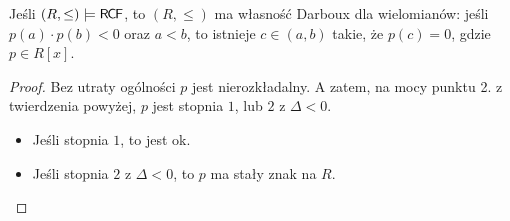 \documentclass{article}
\begin{document}
\begin{wn}
	Jeśli $ (R, \leq) \models \mathsf{R \mkern-1.7mu C \mkern-1.4mu F} $, to $ (R, \leq) $ ma własność Darboux dla wielomianów:
	jeśli $ p(a) \cdot p(b) < 0 $ oraz $ a <b $, to istnieje $c \in (a, b) $ takie, że $ p(c) = 0 $, gdzie $ p \in R[x] $.
\end{wn}
\begin{proof}
	 Bez utraty ogólności $ p $ jest nierozkładalny.
	 A zatem, na mocy punktu 2. z twierdzenia powyżej, $ p $ jest stopnia $ 1 $, lub $ 2 $ z $ \Delta < 0$.
	 \begin{itemize}
		 \item Jeśli stopnia $ 1 $, to jest ok.
		 \item Jeśli stopnia $2$ z $\Delta < 0 $, to $ p $ ma stały znak na $ R $.
	 \end{itemize}

\end{proof}
\end{document}
